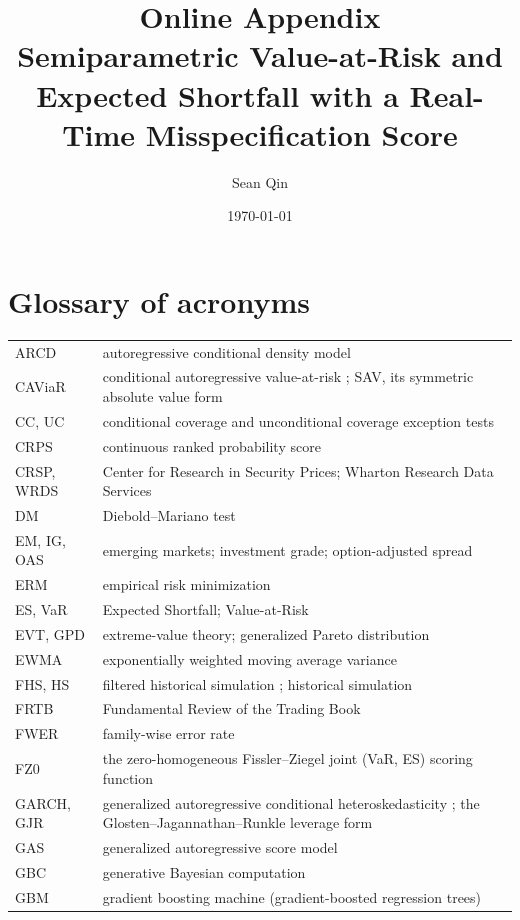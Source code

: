 \documentclass[11pt]{article}
\title{Online Appendix\\ \large Semiparametric Value-at-Risk and Expected Shortfall with a Real-Time Misspecification Score}
\author{Sean Qin}
\date{\today}
\begin{document}
\maketitle
\section{Glossary of acronyms}
\begin{tabular}{ll}
\toprule
ARCD & autoregressive conditional density model \citep{hansen1994ARCD} \\
CAViaR & conditional autoregressive value-at-risk \citep{engle2004caviar}; SAV, its symmetric absolute value form \\
CC, UC & conditional coverage \citep{christoffersen1998} and unconditional coverage \citep{kupiec1995} exception tests \\
CRPS & continuous ranked probability score \\
CRSP, WRDS & Center for Research in Security Prices; Wharton Research Data Services \\
DM & Diebold--Mariano test \citep{dieboldmariano1995} \\
EM, IG, OAS & emerging markets; investment grade; option-adjusted spread \\
ERM & empirical risk minimization \\
ES, VaR & Expected Shortfall; Value-at-Risk \\
EVT, GPD & extreme-value theory; generalized Pareto distribution \\
EWMA & exponentially weighted moving average variance \citep{riskmetrics1996} \\
FHS, HS & filtered historical simulation \citep{baroneadesi1999fhs}; historical simulation \\
FRTB & Fundamental Review of the Trading Book \citep{bcbs2019frtb} \\
FWER & family-wise error rate \\
FZ0 & the zero-homogeneous Fissler--Ziegel joint (VaR, ES) scoring function \citep{fissler2016, patton2019} \\
GARCH, GJR & generalized autoregressive conditional heteroskedasticity \citep{bollerslev1986}; the Glosten--Jagannathan--Runkle leverage form \citep{glosten1993} \\
GAS & generalized autoregressive score model \citep{patton2019} \\
GBC & generative Bayesian computation \citep{polson2023gbc} \\
GBM & gradient boosting machine (gradient-boosted regression trees) \\

\end{tabular}
\end{document}
